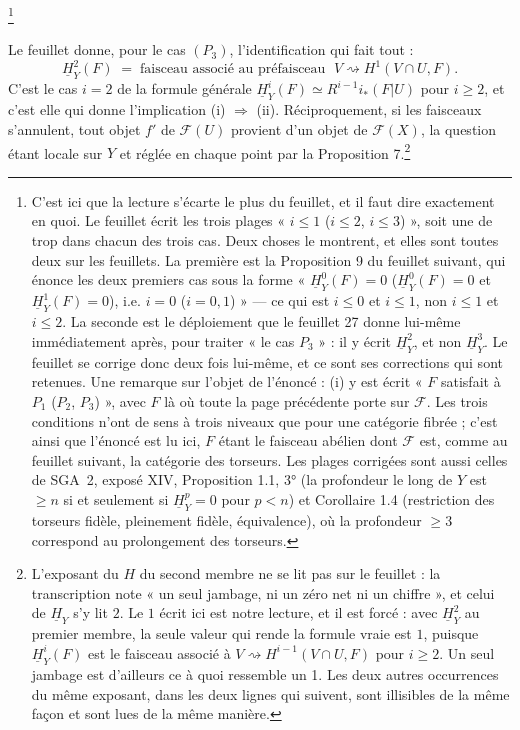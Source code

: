 \documentclass[11pt,a4paper]{article}
\begin{document}
\footnote{C'est ici que la lecture s'écarte le plus du feuillet, et il faut dire
exactement en quoi. Le feuillet écrit les trois plages « $i \leqslant 1$
($i \leqslant 2$, $i \leqslant 3$) », soit une de trop dans chacun des trois
cas. Deux choses le montrent, et elles sont toutes deux sur les feuillets. La
première est la Proposition 9 du feuillet suivant, qui énonce les deux premiers
cas sous la forme « $\underline{H}^{0}_{Y}(F) = 0$
($\underline{H}^{0}_{Y}(F) = 0$ et $\underline{H}^{1}_{Y}(F) = 0$), i.e. $i = 0$
($i = 0, 1$) » — ce qui est $i \leqslant 0$ et $i \leqslant 1$, non
$i \leqslant 1$ et $i \leqslant 2$. La seconde est le déploiement que le
feuillet 27 donne lui-même immédiatement après, pour traiter « le cas
$P_{3}$ » : il y écrit $\underline{H}^{2}_{Y}$, et non $\underline{H}^{3}_{Y}$.
Le feuillet se corrige donc deux fois lui-même, et ce sont ses corrections qui
sont retenues. Une remarque sur l'objet de l'énoncé : (i) y est écrit « $F$
satisfait à $P_{1}$ ($P_{2}$, $P_{3}$) », avec $F$ là où toute la page précédente
porte sur $\mathcal{F}$. Les trois conditions n'ont de sens à trois niveaux que
pour une catégorie fibrée ; c'est ainsi que l'énoncé est lu ici, $F$ étant le
faisceau abélien dont $\mathcal{F}$ est, comme au feuillet suivant, la catégorie
des torseurs. Les plages corrigées sont aussi celles de SGA~2, exposé XIV,
Proposition 1.1, 3° (la profondeur le long de $Y$ est $\geqslant n$ si et
seulement si $\underline{H}^{p}_{Y} = 0$ pour $p < n$) et Corollaire 1.4
(restriction des torseurs fidèle, pleinement fidèle, équivalence), où la
profondeur $\geqslant 3$ correspond au prolongement des torseurs.}

Le feuillet donne, pour le cas $(P_{3})$, l'identification qui fait tout :
\[
  \underline{H}^{2}_{Y}(F) \;=\;
  \text{faisceau associé au préfaisceau } \;
  V \rightsquigarrow H^{1}(V \cap U, F) .
\]
C'est le cas $i = 2$ de la formule générale $\underline{H}^{i}_{Y}(F) \simeq
R^{i-1}i_{*}(F|U)$ pour $i \geqslant 2$, et c'est elle qui donne l'implication
(i) $\Rightarrow$ (ii). Réciproquement, si les faisceaux s'annulent, tout objet
$f'$ de $\mathcal{F}(U)$ provient d'un objet de $\mathcal{F}(X)$, la question
étant locale sur $Y$ et réglée en chaque point par la Proposition
7.\footnote{L'exposant du $H$ du second membre ne se lit pas sur le feuillet :
la transcription note « un seul jambage, ni un zéro net ni un chiffre », et
celui de $\underline{H}_{Y}$ s'y lit $2$. Le $1$ écrit ici est notre lecture, et
il est forcé : avec $\underline{H}^{2}_{Y}$ au premier membre, la seule valeur
qui rende la formule vraie est $1$, puisque $\underline{H}^{i}_{Y}(F)$ est le
faisceau associé à $V \rightsquigarrow H^{i-1}(V \cap U, F)$ pour
$i \geqslant 2$. Un seul jambage est d'ailleurs ce à quoi ressemble un 1. Les
deux autres occurrences du même exposant, dans les deux lignes qui suivent, sont
illisibles de la même façon et sont lues de la même manière.}
\end{document}
